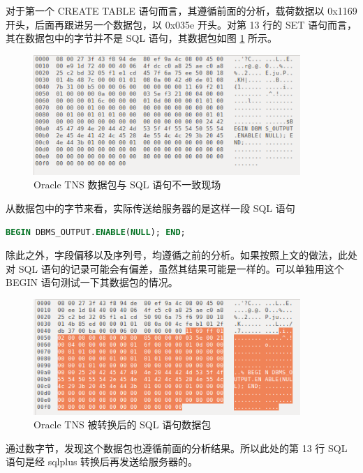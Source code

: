 对于第一个 {\cf CREATE TABLE} 语句而言，其遵循前面的分析，载荷数据以 {\cf 0x1169} 开头，后面再跟进另一个数据包，以 {\cf 0x035e} 开头。对第 13 行的 {\cf SET} 语句而言，其在数据包中的字节并不是 SQL 语句，其数据包如图 \ref{fig:tns-set-output} 所示。

\begin{figure}[ht!]
    \caption{Oracle TNS 数据包与 SQL 语句不一致现场}
    \label{fig:tns-set-output}
    \centering
    \includegraphics[width=0.9\textwidth]{tns-set-output.png}
\end{figure}

从数据包中的字节来看，实际传送给服务器的是这样一段 SQL 语句

\begin{lstlisting}[language=sql]
BEGIN DBMS_OUTPUT.ENABLE(NULL); END;
\end{lstlisting}

除此之外，字段偏移以及序列号，均遵循之前的分析。如果按照上文的做法，此处对 SQL 语句的记录可能会有偏差，虽然其结果可能是一样的。可以单独用这个 {\cf BEGIN} 语句测试一下其数据包的情况。

\begin{figure}[ht!]
    \caption{Oracle TNS 被转换后的 SQL 语句数据包}
    \label{fig:tns-origin-sql}
    \centering
    \includegraphics[width=0.9\textwidth]{tns-origin-sql.png}
\end{figure}

通过数字节，发现这个数据包也遵循前面的分析结果。所以此处的第 13 行 SQL 语句是经 sqlplus 转换后再发送给服务器的。

